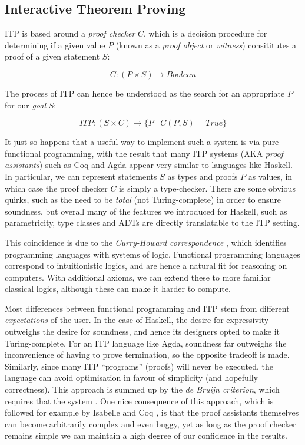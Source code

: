\documentclass[]{article}
\begin{document}
\subsection{Interactive Theorem Proving}
\label{itp}

ITP is based around a \emph{proof checker} $C$, which is a decision procedure for determining if a given value $P$ (known as a \emph{proof object} or \emph{witness}) consititutes a proof of a given statement $S$:

$$ C \colon (P \times S) \rightarrow Boolean $$

The process of ITP can hence be understood as the search for an appropriate $P$ for our \emph{goal} $S$:

$$ ITP \colon (S \times C) \rightarrow \{ P \mid C(P, S) = True \} $$

It just so happens that a useful way to implement such a system is via pure functional programming, with the result that many ITP systems (AKA \emph{proof assistants}) such as Coq and Agda appear very similar to languages like Haskell. In particular, we can represent statements $S$ as types and proofs $P$ as values, in which case the proof checker $C$ is simply a type-checker. There are some obvious quirks, such as the need to be \emph{total} (not Turing-complete) in order to ensure soundness, but overall many of the features we introduced for Haskell, such as parametricity, type classes and ADTs are directly translatable to the ITP setting.

This coincidence is due to the \emph{Curry-Howard correspondence} \cite{wadler2015propositions}, which identifies programming languages with systems of logic. Functional programming languages correspond to intuitionistic logics, and are hence a natural fit for reasoning on computers. With additional axioms, we can extend these to more familiar classical logics, although these can make it harder to compute.

Most differences between functional programming and ITP stem from different \emph{expectations} of the user. In the case of Haskell, the desire for expressivity outweighs the desire for soundness, and hence its designers opted to make it Turing-complete. For an ITP language like Agda, soundness far outweighs the inconvenience of having to prove termination, so the opposite tradeoff is made. Similarly, since many ITP ``programs'' (proofs) will never be executed, the language can avoid optimisation in favour of simplicity (and hopefully correctness). This approach is summed up by the \emph{de Bruijn criterion}, which requires that the system  \cite[\S~2]{barendregt2001proof} \cite{barendregt2001proof}. One nice consequence of this approach, which is followed for example by Isabelle \cite{nipkow2002isabelle} and Coq \cite{bertot2013interactive}, is that the proof assistants themselves can become arbitrarily complex and even buggy, yet as long as the proof checker remains simple we can maintain a high degree of our confidence in the results.
\end{document}

